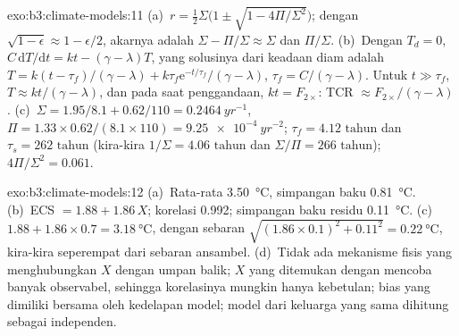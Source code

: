 \begin{solution}{exo:b3:climate-models:11}
(a)~$r = \tfrac12\Sigma\big(1 \pm \sqrt{1 - 4\Pi/\Sigma^2}\big)$; dengan
$\sqrt{1 - \epsilon} \approx 1 - \epsilon/2$, akarnya adalah $\Sigma -
\Pi/\Sigma \approx \Sigma$ dan $\Pi/\Sigma$. (b)~Dengan $T_d = 0$, $C\,\mathrm
dT/\mathrm dt = kt - (\gamma - \lambda)T$, yang solusinya dari keadaan diam adalah $T =
k(t - \tau_f)/(\gamma - \lambda) + k\tau_f\mathrm e^{-t/\tau_f}/(\gamma -
\lambda)$, $\tau_f = C/(\gamma - \lambda)$. Untuk $t \gg \tau_f$, $T \approx
kt/(\gamma - \lambda)$, dan pada saat penggandaan, $kt = F_{2\times}$: TCR
$\approx F_{2\times}/(\gamma - \lambda)$. (c)~$\Sigma = 1.95/8.1 +
0.62/110 = \qty{0.2464}{yr^{-1}}$, $\Pi = 1.33\times0.62/(8.1\times110) =
\qty{9.25e-4}{yr^{-2}}$; $\tau_f = \num{4.12}\text{ tahun}$ dan $\tau_s =
\num{262}\text{ tahun}$ (kira-kira $1/\Sigma = \num{4.06}\text{ tahun}$ dan
$\Sigma/\Pi = \num{266}\text{ tahun}$); $4\Pi/\Sigma^2 = 0.061$.
\end{solution}

\begin{solution}{exo:b3:climate-models:12}
(a)~Rata-rata \qty{3.50}{\celsius}, simpangan baku \qty{0.81}{\celsius}.
(b)~ECS $= 1.88 + 1.86\,X$; korelasi \num{0.992}; simpangan baku
residu \qty{0.11}{\celsius}. (c)~$1.88 + 1.86\times0.7 =
\qty{3.18}{\celsius}$, dengan sebaran $\sqrt{(1.86\times0.1)^2 + 0.11^2} =
\qty{0.22}{\celsius}$, kira-kira seperempat dari sebaran ansambel.
(d)~Tidak ada mekanisme fisis yang menghubungkan $X$ dengan umpan balik; $X$ yang
ditemukan dengan mencoba banyak observabel, sehingga korelasinya mungkin hanya kebetulan; bias
yang dimiliki bersama oleh kedelapan model; model dari keluarga yang sama dihitung sebagai
independen.
\end{solution}

